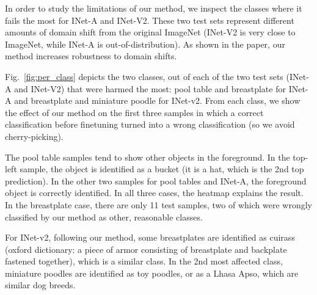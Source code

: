 \documentclass{article}
\begin{document}
In order to study the limitations of our method, we inspect the classes where it fails the most for INet-A and INet-V2. These two test sets represent different amounts of domain shift from the original ImageNet (INet-V2 is very close to ImageNet, while INet-A is out-of-distribution). As shown in the paper, our method increases robustness to domain shifts. 

Fig.~\ref{fig:per_class} depicts the two classes, out of each of the two test sets (INet-A and INet-V2) that were harmed the most: pool table and breastplate for INet-A and breastplate and miniature poodle for INet-v2. From each class, we show the effect of our method on the first three samples in which a correct classification before finetuning turned into a wrong classification (so we avoid cherry-picking). 

The pool table samples tend to show other objects in the foreground. In the top-left sample, the object is identified as a bucket (it is a hat, which is the 2nd top prediction). In the other two samples for pool tables and INet-A, the foreground object is correctly identified. In all three cases, the heatmap explains the result. In the breastplate case, there are only 11 test samples, two of which were wrongly classified by our method as other, reasonable classes. 

For INet-v2, following our method, some breastplates are identified as cuirass (oxford dictionary: a piece of armor consisting of breastplate and backplate fastened together), which is a similar class. In the 2nd most affected class, miniature poodles are identified as toy poodles, or as a Lhasa Apso, which are similar dog breeds.
\end{document}
